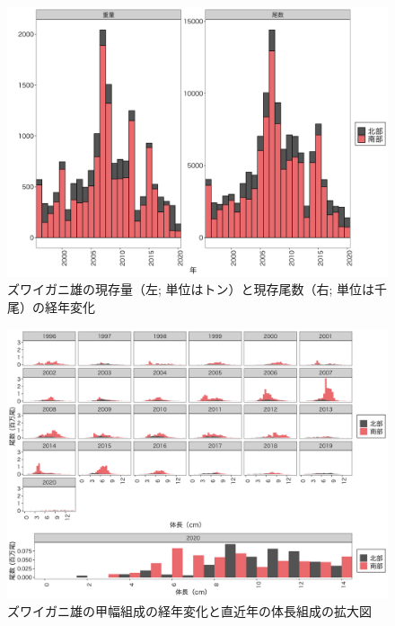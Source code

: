 \documentclass[11pt]{article} %
\begin{document}
\begin{linenumbers}
\begin{figure}[h]
  \centering
  \includegraphics[width = 14cm]{ズワイガニ雄trend.png}
  \caption{ズワイガニ雄の現存量（左; 単位はトン）と現存尾数（右; 単位は千尾）の経年変化}
\end{figure}

\begin{figure}[h]
  \centering
  \includegraphics[width = 14cm]{ズワイガニ雄length.png}
  \caption{ズワイガニ雄の甲幅組成の経年変化と直近年の体長組成の拡大図}
\end{figure}


\end{linenumbers}
\end{document}
